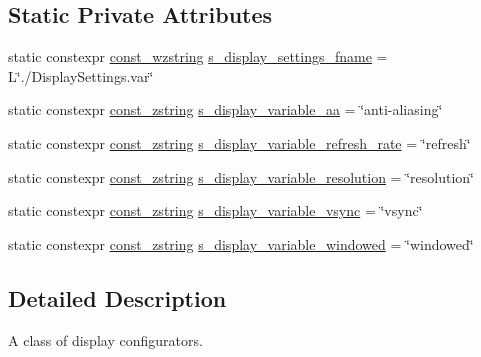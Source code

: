 \subsection*{Static Private Attributes}
\begin{DoxyCompactItemize}
\item 
static constexpr \mbox{\hyperlink{namespacemage_ac409e0f2a22292a3a4cd42742994fbf0}{const\+\_\+wzstring}} \mbox{\hyperlink{classmage_1_1rendering_1_1_display_configurator_1_1_impl_a2ead8221b0659d05699de6ef4d3c0ba4}{s\+\_\+display\+\_\+settings\+\_\+fname}} = L\char`\"{}./Display\+Settings.\+var\char`\"{}
\item 
static constexpr \mbox{\hyperlink{namespacemage_abfd9206dc607ceb5d13ec68bf075a5c0}{const\+\_\+zstring}} \mbox{\hyperlink{classmage_1_1rendering_1_1_display_configurator_1_1_impl_a017dade5658f0a4fa0a56fec2fe30d52}{s\+\_\+display\+\_\+variable\+\_\+aa}} = \char`\"{}anti-\/aliasing\char`\"{}
\item 
static constexpr \mbox{\hyperlink{namespacemage_abfd9206dc607ceb5d13ec68bf075a5c0}{const\+\_\+zstring}} \mbox{\hyperlink{classmage_1_1rendering_1_1_display_configurator_1_1_impl_ae8cb7050d662cc3e5cd6ff97465517a6}{s\+\_\+display\+\_\+variable\+\_\+refresh\+\_\+rate}} = \char`\"{}refresh\char`\"{}
\item 
static constexpr \mbox{\hyperlink{namespacemage_abfd9206dc607ceb5d13ec68bf075a5c0}{const\+\_\+zstring}} \mbox{\hyperlink{classmage_1_1rendering_1_1_display_configurator_1_1_impl_af9c853047964698a8810e71bf4483a10}{s\+\_\+display\+\_\+variable\+\_\+resolution}} = \char`\"{}resolution\char`\"{}
\item 
static constexpr \mbox{\hyperlink{namespacemage_abfd9206dc607ceb5d13ec68bf075a5c0}{const\+\_\+zstring}} \mbox{\hyperlink{classmage_1_1rendering_1_1_display_configurator_1_1_impl_aee0b8c95b78b2e63655c3f294b56504b}{s\+\_\+display\+\_\+variable\+\_\+vsync}} = \char`\"{}vsync\char`\"{}
\item 
static constexpr \mbox{\hyperlink{namespacemage_abfd9206dc607ceb5d13ec68bf075a5c0}{const\+\_\+zstring}} \mbox{\hyperlink{classmage_1_1rendering_1_1_display_configurator_1_1_impl_a9d3c183714f56deaa9e55160c478bb27}{s\+\_\+display\+\_\+variable\+\_\+windowed}} = \char`\"{}windowed\char`\"{}
\end{DoxyCompactItemize}


\subsection{Detailed Description}
A class of display configurators. 

